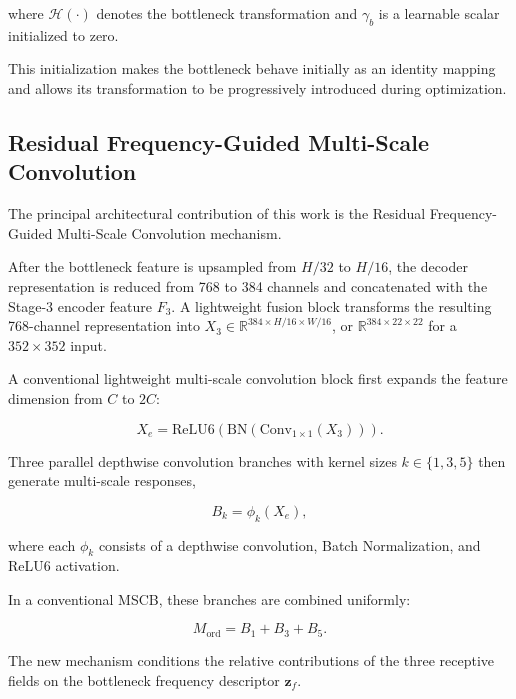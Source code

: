 where $\mathcal{H}(\cdot)$ denotes the bottleneck transformation and $\gamma_b$ is a learnable scalar initialized to zero.

This initialization makes the bottleneck behave initially as an identity mapping and allows its transformation to be progressively introduced during optimization.

\subsection{Residual Frequency-Guided Multi-Scale Convolution}

The principal architectural contribution of this work is the Residual Frequency-Guided Multi-Scale Convolution mechanism.

After the bottleneck feature is upsampled from $H/32$ to $H/16$, the decoder representation is reduced from 768 to 384 channels and concatenated with the Stage-3 encoder feature $F_3$. A lightweight fusion block transforms the resulting 768-channel representation into $X_3\in\mathbb{R}^{384\times H/16\times W/16}$, or $\mathbb{R}^{384\times22\times22}$ for a $352\times352$ input.

A conventional lightweight multi-scale convolution block first expands the feature dimension from $C$ to $2C$:

\begin{equation}
X_e=
\mathrm{ReLU6}
\left(
\mathrm{BN}
\left(
\mathrm{Conv}_{1\times1}(X_3)
\right)
\right).
\label{eq:mscb_expansion}
\end{equation}

Three parallel depthwise convolution branches with kernel sizes $k\in\{1,3,5\}$ then generate multi-scale responses,

\begin{equation}
B_k=\phi_k(X_e),
\label{eq:mscb_branches}
\end{equation}

where each $\phi_k$ consists of a depthwise convolution, Batch Normalization, and ReLU6 activation.

In a conventional MSCB, these branches are combined uniformly:

\begin{equation}
M_{\mathrm{ord}}
=
B_1+B_3+B_5.
\label{eq:mscb_ordinary_aggregation}
\end{equation}

The new mechanism conditions the relative contributions of the three receptive fields on the bottleneck frequency descriptor $\mathbf{z}_f$.

